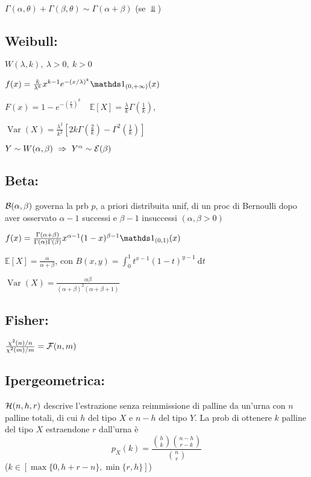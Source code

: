 $\Gamma(\alpha,\theta)+\Gamma(\beta,\theta)\sim\Gamma(\alpha+\beta)$ (se $\Perp$)

\subsection{Weibull:} 

$W(\lambda, k),\ \lambda>0,\ k>0$

$f(x)=\frac{k}{\lambda^{k}} x^{k-1} e^{-(x / \lambda)^{k}} \Ind_{(0,+\infty)}(x)$

$F(x)=1-e^{-\left(\frac{x}{\lambda}\right)^{k}}\quad \mathbb{E}[X]=\frac{\lambda}{k} \Gamma\left(\frac{1}{k}\right)$,

$\operatorname{Var}(X)=\frac{\lambda^{2}}{k^{2}}\left[2 k \Gamma\left(\frac{2}{k}\right)-\Gamma^{2}\left(\frac{1}{k}\right)\right]$

$Y\sim W(\alpha,\beta)\ \Rightarrow \ Y^\alpha\sim\Ec(\beta)$

\subsection{Beta:}

$\mathcal{B}(\alpha, \beta)$ governa la prb $p$, a priori distribuita unif, di un proc di Bernoulli dopo aver osservato $\alpha-1$ successi e $\beta-1$ insuccessi $(\alpha, \beta>0)$

$f(x)=\frac{\Gamma(\alpha+\beta)}{\Gamma(\alpha)\Gamma(\beta)}x^{\alpha-1}(1-x)^{\beta-1}\Ind_{(0,1)}(x)$

$\mathbb{E}[X]=\frac{\alpha}{\alpha+\beta}$, con $B(x, y)=\int_{0}^{1} t^{x-1}(1-t)^{y-1} \mathrm{~d} t$

$\operatorname{Var}(X)=\frac{\alpha \beta}{(\alpha+\beta)^{2}(\alpha+\beta+1)}$

\subsection{Fisher:}

$\frac{\chi^2(n)/n}{\chi^2(m)/m}=\mathcal{F}(n,m)$

\subsection{Ipergeometrica:}

$\mathcal{H}(n,h,r)$ descrive l'estrazione senza reimmissione di palline da un'urna con $n$ palline totali, di cui $h$ del tipo $X$ e $n-h$ del tipo $Y$. La prob di ottenere $k$ palline del tipo $X$ estraendone $r$ dall'urna è
\begin{equation*}
p_X(k)=\frac{\binom{h}{k} \binom{n-h}{r-k}}{\binom{n}{r}}
\end{equation*}
($k\in [\max\{0,h+r-n\},\min\{r,h\}]$)

